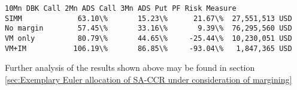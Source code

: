             \begin{tcolorbox}[breakable, size=fbox, boxrule=.5pt, pad at break*=1mm, opacityfill=0]
\begin{Verbatim}[commandchars=\\\{\}]
          10Mn DBK Call 2Mn ADS Call 3Mn ADS Put PF Risk Measure
SIMM             63.10\%       15.23\%      21.67\%  27,551,513 USD
No margin        57.45\%       33.16\%       9.39\%  76,295,560 USD
VM only          80.79\%       44.65\%     -25.44\%  10,230,051 USD
VM+IM           106.19\%       86.85\%     -93.04\%   1,847,365 USD
\end{Verbatim}
\end{tcolorbox}
        
    Further analysis of the results shown above may be found in section
\ref{sec:Exemplary Euler allocation of SA-CCR under consideration of margining}


